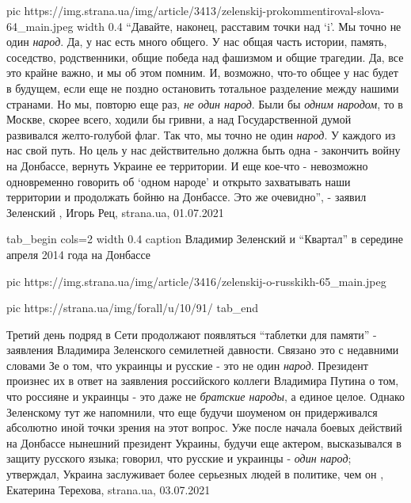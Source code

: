 \ifcmt
  pic https://img.strana.ua/img/article/3413/zelenskij-prokommentiroval-slova-64_main.jpeg
	width 0.4
\fi
\enquote{Давайте, наконец, расставим точки над \enquote{i}. Мы точно не один
\emph{народ}. Да, у нас есть много общего. У нас общая часть истории, память,
соседство, родственники, общие победа над фашизмом и общие трагедии. Да, все
это крайне важно, и мы об этом помним. И, возможно, что-то общее у нас будет в
будущем, если еще не поздно остановить тотальное разделение между нашими
странами. Но мы, повторю еще раз, \emph{не один народ}. Были бы \emph{одним народом}, то в
Москве, скорее всего, ходили бы гривни, а над Государственной думой развивался
желто-голубой флаг. Так что, мы точно не один \emph{народ}. У каждого из нас свой
путь. Но цель у нас действительно должна быть одна - закончить войну на
Донбассе, вернуть Украине ее территории. И еще кое-что - невозможно
одновременно говорить об \enquote{одном народе} и открыто захватывать наши
территории и продолжать бойню на Донбассе.  Это же очевидно}, - заявил
Зеленский
, Игорь Рец, strana.ua, 01.07.2021



\ifcmt
  tab_begin cols=2
		width 0.4
		 caption Владимир Зеленский и \enquote{Квартал} в середине апреля 2014 года на Донбассе 

     pic https://img.strana.ua/img/article/3416/zelenskij-o-russkikh-65_main.jpeg

     pic https://strana.ua/img/forall/u/10/91/%
  tab_end
\fi

Третий день подряд в Сети продолжают появляться \enquote{таблетки для памяти} -
заявления Владимира Зеленского семилетней давности.  Связано это с недавними
словами Зе о том, что украинцы и русские - это не один \emph{народ}. Президент
произнес их в ответ на заявления российского коллеги Владимира Путина о том,
что россияне и украинцы - это даже не \emph{братские народы}, а единое целое.  Однако
Зеленскому тут же напомнили, что еще будучи шоуменом он придерживался абсолютно
иной точки зрения на этот вопрос.  Уже после начала боевых действий на Донбассе
нынешний президент Украины, будучи еще актером, высказывался в защиту русского
языка; говорил, что русские и украинцы - \emph{один народ}; утверждал, Украина
заслуживает более серьезных людей в политике, чем он
, 
Екатерина Терехова, strana.ua, 03.07.2021

